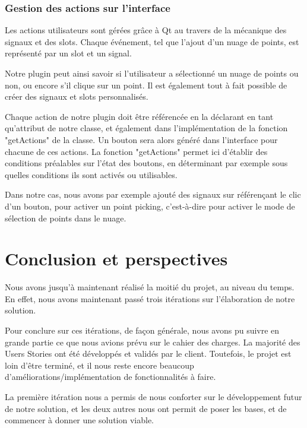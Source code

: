 \documentclass[12pt,titlepage,french]{article}
\begin{document}
\subsubsection{Gestion des actions sur l'interface}

Les actions utilisateurs sont gérées grâce à Qt au travers de la mécanique des signaux et des slots. Chaque événement, tel que l'ajout d'un nuage de points, est représenté par un slot et un signal. \newline

Notre plugin peut ainsi savoir si l'utilisateur a sélectionné un nuage de points ou non, ou encore s'il clique sur un point. Il est également tout à fait possible de créer des signaux et slots personnalisés. \newline

Chaque action de notre plugin doit être référencée en la déclarant en tant qu'attribut de notre classe, et également dans l'implémentation de la fonction "getActions" de la classe. Un bouton sera alors généré dans l'interface pour chacune de ces actions. La fonction "getActions" permet ici d'établir des conditions préalables sur l'état des boutons, en déterminant par exemple sous quelles conditions ils sont activés ou utilisables. \newline

Dans notre cas, nous avons par exemple ajouté des signaux sur référençant le clic d'un bouton, pour activer un point picking, c'est-à-dire pour activer le mode de sélection de points dans le nuage.

\newpage
\section{Conclusion et perspectives}

Nous avons jusqu'à maintenant réalisé la moitié du projet, au niveau du temps. En effet, nous avons maintenant passé trois itérations sur l'élaboration de notre solution. \newline

Pour conclure sur ces itérations, de façon générale, nous avons pu suivre en grande partie ce que nous avions prévu sur le cahier des charges. La majorité des Users Stories ont été développés et validés par le client. Toutefois, le projet est loin d'être terminé, et il nous reste encore beaucoup d'améliorations/implémentation de fonctionnalités à faire.

La première itération nous a permis de nous conforter sur le développement futur de notre solution, et les deux autres nous ont permit de poser les bases, et de commencer à donner une solution viable.
\end{document}
